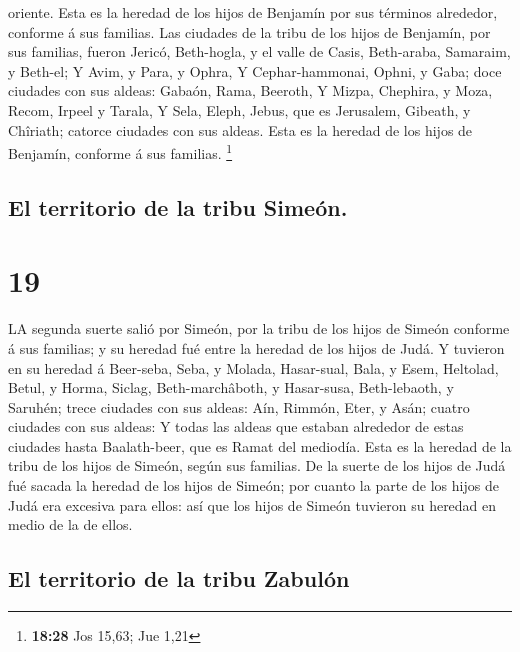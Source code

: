 oriente. Esta es la heredad de los hijos de Benjamín por sus términos
alrededor, conforme á sus familias.  Las ciudades de la
tribu de los hijos de Benjamín, por sus familias, fueron Jericó,
Beth-hogla, y el valle de Casis,  Beth-araba, Samaraim, y
Beth-el;  Y Avim, y Para, y Ophra,  Y
Cephar-hammonai, Ophni, y Gaba; doce ciudades con sus aldeas:
 Gabaón, Rama, Beeroth,  Y Mizpa,
Chephira, y Moza,  Recom, Irpeel y Tarala,
 Y Sela, Eleph, Jebus, que es Jerusalem, Gibeath, y
Chîriath; catorce ciudades con sus aldeas. Esta es la heredad de los
hijos de Benjamín, conforme á sus familias. \footnote{\textbf{18:28} Jos
  15,63; Jue 1,21}

\hypertarget{el-territorio-de-la-tribu-simeuxf3n.}{%
\subsection{El territorio de la tribu
Simeón.}\label{el-territorio-de-la-tribu-simeuxf3n.}}

\hypertarget{section-18}{%
\section{19}\label{section-18}}

 LA segunda suerte salió por Simeón, por la tribu de los
hijos de Simeón conforme á sus familias; y su heredad fué entre la
heredad de los hijos de Judá.  Y tuvieron en su heredad á
Beer-seba, Seba, y Molada,  Hasar-sual, Bala, y Esem,
 Heltolad, Betul, y Horma,  Siclag,
Beth-marchâboth, y Hasar-susa,  Beth-lebaoth, y Saruhén;
trece ciudades con sus aldeas:  Aín, Rimmón, Eter, y Asán;
cuatro ciudades con sus aldeas:  Y todas las aldeas que
estaban alrededor de estas ciudades hasta Baalath-beer, que es Ramat del
mediodía. Esta es la heredad de la tribu de los hijos de Simeón, según
sus familias.  De la suerte de los hijos de Judá fué
sacada la heredad de los hijos de Simeón; por cuanto la parte de los
hijos de Judá era excesiva para ellos: así que los hijos de Simeón
tuvieron su heredad en medio de la de ellos.

\hypertarget{el-territorio-de-la-tribu-zabuluxf3n}{%
\subsection{El territorio de la tribu
Zabulón}\label{el-territorio-de-la-tribu-zabuluxf3n}}

